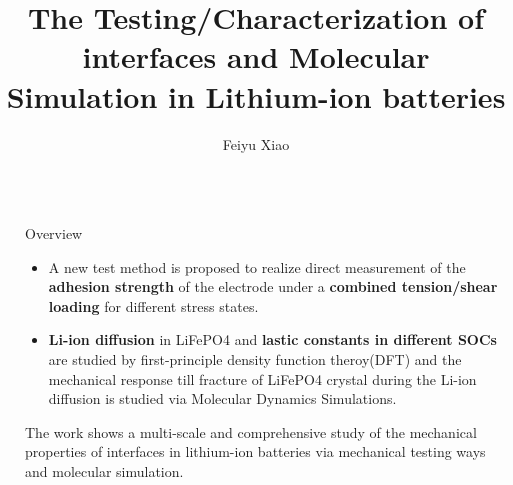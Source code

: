 \documentclass[final]{beamer}
\title{The Testing/Characterization of interfaces and Molecular Simulation in Lithium-ion batteries} %
\author{Feiyu Xiao} %
\institute{TEEP 4, School of Aerospace Engineering} %
\newlength{\sepwid}
\newlength{\onecolwid}
\begin{document}

\setlength{\belowcaptionskip}{2ex} %
\setlength\belowdisplayshortskip{2ex} %

\begin{frame}[t] %

\begin{columns}[t] %

\begin{column}{\sepwid}\end{column} %

\begin{column}{\onecolwid} %


\begin{alertblock}{Overview}
\begin{itemize}
	\item A new test method is proposed to
	realize direct measurement of the \textbf{adhesion strength} of the
	electrode under a \textbf{combined tension/shear loading} for different
	stress states. 
	\item \textbf{Li-ion diffusion} in LiFePO4 and \textbf{lastic constants in different SOCs} are studied by first-principle density function theroy(DFT) and the mechanical response till fracture of LiFePO4 crystal during the Li-ion diffusion is studied via Molecular Dynamics Simulations. 
\end{itemize}
The work shows a multi-scale and comprehensive study of the mechanical properties of interfaces in lithium-ion batteries via mechanical testing ways and molecular simulation.
\end{alertblock}



\end{column}
\end{columns}
\end{frame}
\end{document}
